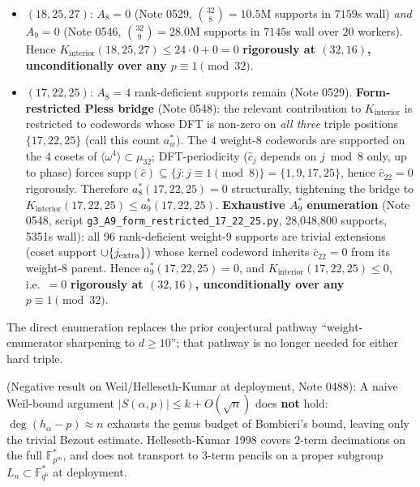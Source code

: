 \documentclass[11pt]{article}
\theoremstyle{definition}
\theoremstyle{remark}
\begin{document}
\begin{itemize}\itemsep0pt
\item $(18, 25, 27)$: $A_8 = 0$ (Note 0529, $\binom{32}{8} = 10.5\text{M}$
supports in $7159$s wall) \emph{and} $A_9 = 0$ (Note 0546,
$\binom{32}{9} = 28.0\text{M}$ supports in $7145$s wall over $20$ workers).
Hence $K_{\text{interior}}(18, 25, 27) \leq 24 \cdot 0 + 0 = 0$
\textbf{rigorously at $(32, 16)$, unconditionally over any
$p \equiv 1 \pmod{32}$}.
\item $(17, 22, 25)$: $A_8 = 4$ rank-deficient supports remain (Note 0529).
\textbf{Form-restricted Pless bridge} (Note 0548): the relevant
contribution to $K_{\text{interior}}$ is restricted to codewords whose
DFT is non-zero on \emph{all three} triple positions $\{17, 22, 25\}$
(call this count $a_w^*$). The $4$ weight-$8$ codewords are supported
on the $4$ cosets of $\langle \omega^4 \rangle \subset \mu_{32}$;
DFT-periodicity ($\hat c_j$ depends on $j \bmod 8$ only, up to phase)
forces $\mathrm{supp}(\hat c) \subseteq \{j : j \equiv 1 \pmod 8\} =
\{1, 9, 17, 25\}$, hence $\hat c_{22} = 0$ rigorously. Therefore
$a_8^*(17, 22, 25) = 0$ structurally, tightening the bridge to
$K_{\text{interior}}(17, 22, 25) \leq a_9^*(17, 22, 25)$.
\textbf{Exhaustive $A_9^*$ enumeration} (Note 0548, script
\texttt{g3\_A9\_form\_restricted\_17\_22\_25.py}, 28,048,800 supports,
5351s wall): all 96 rank-deficient weight-9 supports are trivial extensions
(coset support $\cup \{j_{\rm extra}\}$) whose kernel codeword inherits
$\hat c_{22} = 0$ from its weight-8 parent. Hence $a_9^*(17, 22, 25) = 0$,
and $K_{\text{interior}}(17, 22, 25) \leq 0$, i.e.\ $= 0$
\textbf{rigorously at $(32, 16)$, unconditionally over any $p \equiv 1 \pmod{32}$}.
\end{itemize}
The direct enumeration replaces the prior conjectural pathway
``weight-enumerator sharpening to $d \geq 10$''; that pathway is
no longer needed for either hard triple.

(Negative result on Weil/Helleseth-Kumar at deployment, Note 0488):
A naive Weil-bound argument $|S(\alpha, p)| \leq k + O(\sqrt n)$ does
\textbf{not} hold: $\deg(h_\alpha - p) \approx n$ exhausts the genus
budget of Bombieri's bound, leaving only the trivial Bezout estimate.
Helleseth-Kumar 1998 covers $2$-term decimations on the full
$\mathbb{F}_{p^m}^*$, and does not transport to $3$-term pencils on a
proper subgroup $L_n \subset \mathbb{F}_{q^6}^*$ at deployment.
\end{document}
